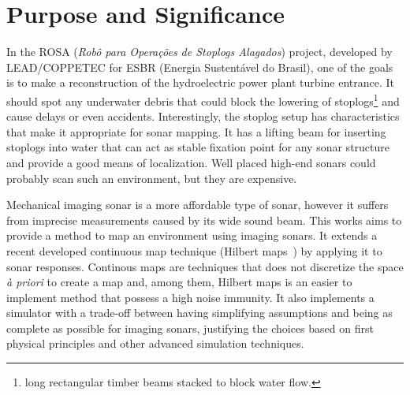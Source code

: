 \section{Purpose and Significance}



In the ROSA (\textit{Robô para Operações de Stoplogs Alagados}) project,
developed by LEAD/COPPETEC for ESBR (Energia Sustentável do Brasil), one of
the goals is to make a reconstruction of the hydroelectric power plant turbine
entrance. It should spot any underwater debris that could block the lowering of
stoplogs\footnote{long rectangular timber beams stacked to block water
flow.} and cause delays or even accidents.
Interestingly, the stoplog setup has characteristics that make it appropriate
for sonar mapping. It has a lifting beam for inserting stoplogs into
water that can act as stable fixation point for any sonar structure and
provide a good means of localization. Well placed high-end sonars could probably
scan such an environment, but they are expensive.

Mechanical imaging sonar is a more affordable type of sonar, however it suffers
from imprecise measurements caused by its wide sound beam. This works aims to
provide a method to map an environment using imaging sonars. It extends a recent
developed continuous map technique (Hilbert maps~\cite{ramos2016hilbert}) by
applying it to sonar responses. Continous maps are techniques that does not
discretize the space \textit{à priori} to create a map and, among them, Hilbert
maps is an easier to implement method that possess a high noise immunity.
It also implements a simulator with a trade-off between having simplifying assumptions and being as complete as possible for
imaging sonars, justifying the choices based on first physical principles and
other advanced simulation techniques.


% 
% 
